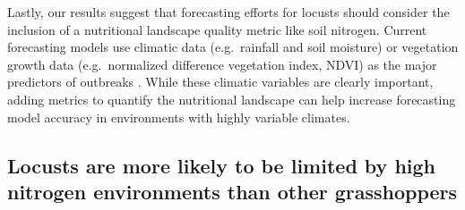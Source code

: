 \documentclass[
]{article}
\begin{document}
Lastly, our results suggest that forecasting efforts for locusts should
consider the inclusion of a nutritional landscape quality metric like
soil nitrogen. Current forecasting models use climatic data
(e.g.~rainfall and soil moisture) or vegetation growth data
(e.g.~normalized difference vegetation index, NDVI) as the major
predictors of outbreaks \citep{cressman_role_2013}. While these climatic
variables are clearly important, adding metrics to quantify the
nutritional landscape can help increase forecasting model accuracy in
environments with highly variable climates.

\subsection{Locusts are more likely to be limited by high nitrogen
environments than other
grasshoppers}\label{locusts-are-more-likely-to-be-limited-by-high-nitrogen-environments-than-other-grasshoppers}
\end{document}
